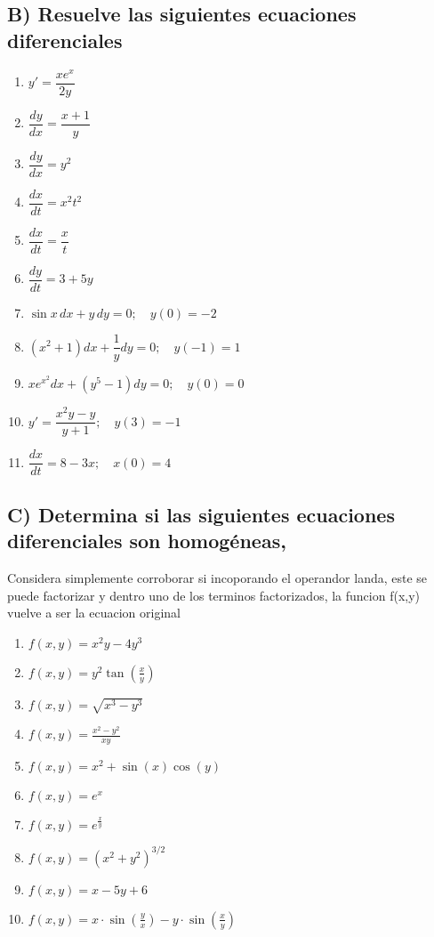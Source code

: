 \documentclass[a4paper,12pt]{article}
\begin{document}
\subsection*{B) Resuelve las siguientes ecuaciones diferenciales}
\begin{multicols}{2}
\begin{enumerate}
  \item $y' = \dfrac{x e^x}{2y}$
  \item $\dfrac{dy}{dx} = \dfrac{x+1}{y}$
  \item $\dfrac{dy}{dx} = y^2$
  \item $\dfrac{dx}{dt} = x^2 t^2$
  \item $\dfrac{dx}{dt} = \dfrac{x}{t}$
  \item $\dfrac{dy}{dt} = 3 + 5y$
  \item $\sin x \, dx + y \, dy = 0; \quad y(0)=-2$
  \item $(x^2+1)dx + \dfrac{1}{y}dy=0; \quad y(-1)=1$
  \item $x e^{x^2} dx + (y^5-1)dy=0; \quad y(0)=0$
  \item $y' = \dfrac{x^2 y - y}{y+1}; \quad y(3)=-1$
  \item $\dfrac{dx}{dt} = 8-3x; \quad x(0)=4$
\end{enumerate}
\end{multicols}
\subsection*{C) Determina si las siguientes ecuaciones diferenciales son homogéneas, }
Considera simplemente corroborar si incoporando el operandor landa, este se puede factorizar y dentro uno de los terminos factorizados, la funcion f(x,y) vuelve a ser la ecuacion original
\begin{multicols}{2}
\begin{enumerate}
    \item $f(x,y)=x^{2} y-4y^{3}$
    \item $f(x,y)=y^{2}\tan\left(\frac{x}{y}\right)$
    \item $f(x,y)=\sqrt{x^{3} -y^{3}}$
    \item $f(x,y)=\frac{x^{2} -y^{2}}{xy}$
    \item $f(x,y)=x^{2} +\sin (x)\cos (y)$
    \item $f(x,y)=e^{x}$
    \item $f(x,y)=e^{\frac{x}{y}}$
    \item $f(x,y)=\left( x^{2} +y^{2}\right)^{3/2}$
    \item $f(x,y)=x-5y+6$
    \item $f(x,y)=x\cdot \sin\left(\frac{y}{x}\right) -y\cdot \sin\left(\frac{x}{y}\right)$
\end{enumerate}
\end{multicols}
\end{document}
